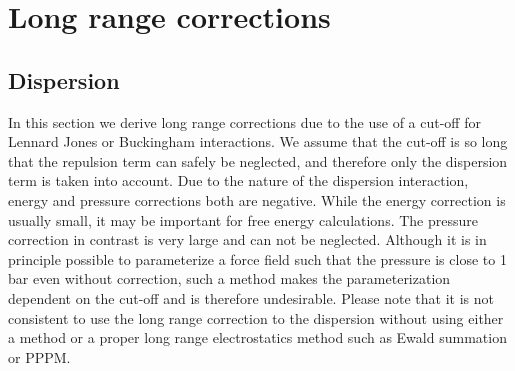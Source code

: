 %
% 
% 
% 
% 
% 
% 
% 
% 
%

\chapter{Long range corrections}
\label{ch:lrcorr}
\section{Dispersion}
In this section we derive long range corrections due to the use of a
cut-off for Lennard Jones or Buckingham interactions.
We assume that the cut-off is
so long that the repulsion term can safely be neglected, and therefore
only the dispersion term is taken into account. Due to the nature of
the dispersion interaction, energy and pressure corrections both are
negative. While the energy correction is usually small, it may be
important for free energy calculations. The pressure correction in
contrast is very large and can not be neglected. Although it is in
principle possible to parameterize a force field such that the pressure
is close to 1 bar even without correction, such a method makes the
parameterization dependent on the cut-off and is therefore
undesirable. Please note that it is not consistent to use the long
range correction to the dispersion without using either a
 method or a proper long range
electrostatics method such as Ewald summation or PPPM.

